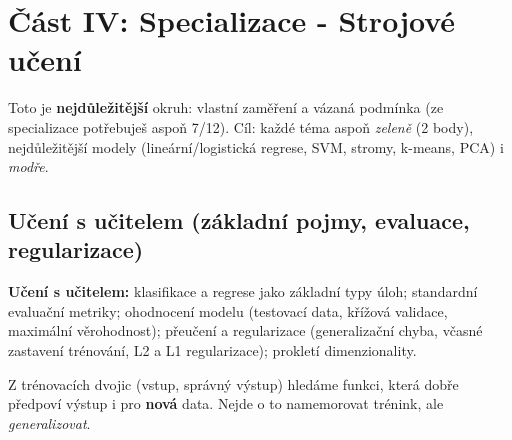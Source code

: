 \section{Část IV: Specializace - Strojové učení}

{\small Toto je \textbf{nejdůležitější} okruh: vlastní zaměření a vázaná podmínka
(ze specializace potřebuješ aspoň 7/12). Cíl: každé téma aspoň \emph{zeleně} (2 body),
nejdůležitější modely (lineární/logistická regrese, SVM, stromy, k-means, PCA) i \emph{modře}.}

\subsection{Učení s učitelem (základní pojmy, evaluace, regularizace)}

\begin{tema}
\textbf{Učení s učitelem:} klasifikace a regrese jako základní typy úloh;
standardní evaluační metriky; ohodnocení modelu (testovací data, křížová validace,
maximální věrohodnost); přeučení a regularizace (generalizační chyba, včasné zastavení
trénování, L2 a L1 regularizace); prokletí dimenzionality.
\end{tema}
\begin{vezkratce}
\end{vezkratce}

\ucivo
\begin{intuice}
Z trénovacích dvojic (vstup, správný výstup) hledáme funkci, která dobře předpoví výstup
i pro \textbf{nová} data. Nejde o to namemorovat trénink, ale \emph{generalizovat}.
\end{intuice}

